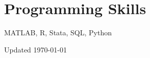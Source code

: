 \documentclass[12pt,letterpaper]{report}
\newcommand{\listitemspace}{0.15em}
\renewenvironment{itemize}
{\begin{list}{}{\setlength{\leftmargin}{0em}
            \setlength{\parskip}{0em}
            \setlength{\itemsep}{\listitemspace}
            \setlength{\parsep}{\listitemspace}}}
    {\end{list}}
\begin{document}
    \section*{Programming Skills}


    \begin{itemize}

        \item MATLAB, R, Stata, SQL, Python

    \end{itemize}

%
%
%

    \begin{center}
        \vfill
        Updated \monthyeardate\today
    \end{center}
\end{document}
